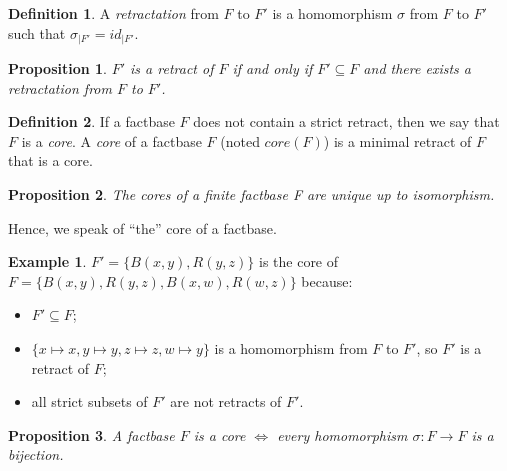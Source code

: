 \documentclass{article}
\newtheorem{proposition}{Proposition}[section]
\theoremstyle{definition}
\newtheorem{definition}{Definition}[section]
\newtheorem{example}{Example}[section]
\theoremstyle{remark}
\begin{document}
\begin{definition}
A \emph{retractation} from $F$ to $F'$ is a homomorphism $\sigma$ from $F$ to $F'$ such that $\sigma_{|F'}=id_{|F'}$.
\end{definition}

\begin{proposition}
$F'$ is a retract of $F$ if and only if $F' \subseteq F$  and there exists a retractation from $F$ to $F'$.
\end{proposition}

\begin{definition}
If a factbase $F$ does not contain a strict retract, then we say that $F$ is a \emph{core}. A \emph{core} of a factbase $F$ (noted \emph{$\textit{core}(F)$}) is a minimal retract of $F$ that is a core.
\end{definition}

\begin{proposition}
The cores of a finite factbase F are unique up to isomorphism.
\end{proposition}

Hence, we speak of ``the'' core of a factbase.

\begin{example}
$F' = \{B(x,y),R(y,z)\}$ is the core of $F = \{B(x,y),R(y,z),B(x,w),R(w,z)\}$ because:
\begin{itemize}
\item $F' \subseteq F$;
\item $\{x \mapsto x, y \mapsto y, z \mapsto z, w \mapsto y\}$ is a homomorphism from $F$ to $F'$, so $F'$ is a retract of $F$;
\item all strict subsets of $F'$ are not retracts of $F'$.
\end{itemize}
\end{example}

\begin{proposition}
A factbase $F$ is a core $\Leftrightarrow$ every homomorphism $\sigma: F \to F$ is a bijection.
\end{proposition}

\end{document}
